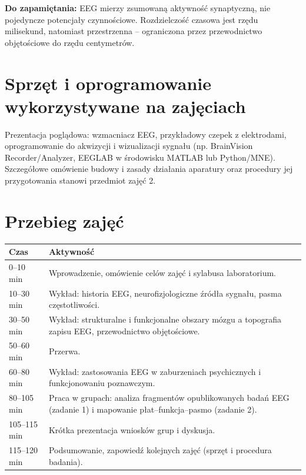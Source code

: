 \documentclass[11pt,a4paper]{article}
\newcommand{\infobox}[1]{%
  \par\noindent\colorbox{lgray}{\parbox{\dimexpr\linewidth-2\fboxsep}{\vspace{2pt}#1\vspace{2pt}}}\par\vspace{4pt}}
\begin{document}
\infobox{\textbf{Do zapamiętania:} EEG mierzy zsumowaną aktywność synaptyczną, nie pojedyncze potencjały czynnościowe. Rozdzielczość czasowa jest rzędu milisekund, natomiast przestrzenna -- ograniczona przez przewodnictwo objętościowe do rzędu centymetrów.}

\section{Sprzęt i oprogramowanie wykorzystywane na zajęciach}
Prezentacja poglądowa: wzmacniacz EEG, przykładowy czepek z elektrodami, oprogramowanie do akwizycji i wizualizacji sygnału (np. BrainVision Recorder/Analyzer, EEGLAB w środowisku MATLAB lub Python/MNE). Szczegółowe omówienie budowy i zasady działania aparatury oraz procedury jej przygotowania stanowi przedmiot zajęć 2.

\section{Przebieg zajęć}
\begin{center}
\begin{tabular}{p{} p{}}
\toprule
\textbf{Czas} &
\textbf{Aktywność}\\
\midrule
0--10 min & Wprowadzenie, omówienie celów zajęć i sylabusa laboratorium.\\
10--30 min & Wykład: historia EEG, neurofizjologiczne źródła sygnału, pasma częstotliwości.\\
30--50 min & Wykład: strukturalne i funkcjonalne obszary mózgu a topografia zapisu EEG, przewodnictwo objętościowe.\\
50--60 min & Przerwa.\\
60--80 min & Wykład: zastosowania EEG w zaburzeniach psychicznych i funkcjonowaniu poznawczym.\\
80--105 min & Praca w grupach: analiza fragmentów opublikowanych badań EEG (zadanie 1) i mapowanie płat--funkcja--pasmo (zadanie 2).\\
105--115 min & Krótka prezentacja wniosków grup i dyskusja.\\
115--120 min & Podsumowanie, zapowiedź kolejnych zajęć (sprzęt i procedura badania).\\
\bottomrule
\end{tabular}
\end{center}
\end{document}
